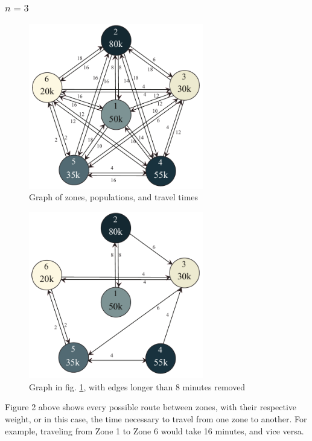 \documentclass[notitlepage, 12pt]{article}
\begin{document}
\subsubsection{$n=3$}

\begin{figure}[htbp]
\label{fig:fullgraph}
\caption{Graph of zones, populations, and travel times}
\begin{center}
\includegraphics[width=3in]{6point.pdf}
\end{center}
\end{figure}

\begin{figure}[htbp]
\begin{center}
\includegraphics[width=3in]{greedy6point.pdf}
\caption{Graph in fig. \ref{fig:fullgraph}, with edges longer than 8 minutes removed}
\end{center}
\end{figure}

Figure 2 above shows every possible route between zones, with their respective weight, or in this case, the time necessary to travel from one zone to another. For example, traveling from Zone 1 to Zone 6 would take 16 minutes, and vice versa.
\end{document}
